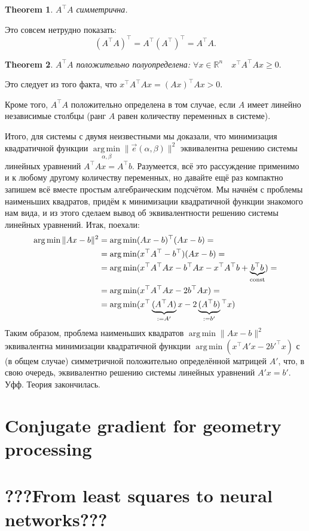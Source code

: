 \documentclass[notitlepage]{report}
\DeclareMathOperator*{\argmin}{arg\,min}
\newtheorem{theorem}{Theorem}
\begin{document}
\begin{theorem}
$A^\top A$ симметрична.
\end{theorem}
Это совсем нетрудно показать:
$$
(A^\top A)^\top = A^\top (A^\top)^\top = A^\top A.
$$

\begin{theorem}
	$A^\top A$ положительно полуопределена: $\forall x\in \mathbb R^n\quad x^\top A^\top A x \geq 0.$
\end{theorem}
Это следует из того факта, что $x^\top A^\top A x = (A x)^\top A x > 0$.

Кроме того, $A^\top A$ положительно определена в том случае, если $A$ имеет линейно независимые столбцы (ранг $A$ равен количеству переменных в системе).

\vspace{5mm}

Итого, для системы с двумя неизвестными мы доказали, что минимизация 
квадратичной функции $\argmin\limits_{\alpha, \beta} \|\vec{e}(\alpha, \beta)\|^2$ эквивалентна решению системы линейных уравнений $A^\top A x = A^\top b$. Разумеется, всё это рассуждение применимо и к любому другому количеству переменных, но давайте ещё раз компактно запишем всё вместе простым алгебраическим подсчётом.
Мы начнём с проблемы наименьших квадратов, придём к минимизации квадратичной функции знакомого нам вида,
и из этого сделаем вывод об эквивалентности решению системы линейных уравнений. Итак, поехали:
\begin{align*}
\argmin \| Ax - b \|^2 &= \argmin (Ax-b)^\top (Ax-b) =\\
& = \argmin(x^\top A^\top - b^\top)(Ax-b) = \\
& = \argmin(x^\top A^\top A x - b^\top Ax - x^\top A^\top b + \underbrace{b^\top b}_{\rm const})=\\
& = \argmin(x^\top A^\top A x - 2b^\top Ax) = \\
& = \argmin(x^\top \underbrace{(A^\top A)}_{:=A'} x - 2\underbrace{(A^\top b)}_{:=b'}\phantom{}^\top x)
\end{align*}
Таким образом, проблема наименьших квадратов $\argmin \| Ax - b \|^2$  эквивалентна минимизации квадратичной функции $\argmin (x^\top A' x - 2b'^\top x)$ с (в общем случае) симметричной положительно определённой матрицей $A'$, что, в свою очередь, эквивалентно решению системы линейных уравнений $A'x = b'$. Уфф. Теория закончилась.


\chapter{Conjugate gradient for geometry processing}
\chapter{???From least squares to neural networks???}
\end{document}
